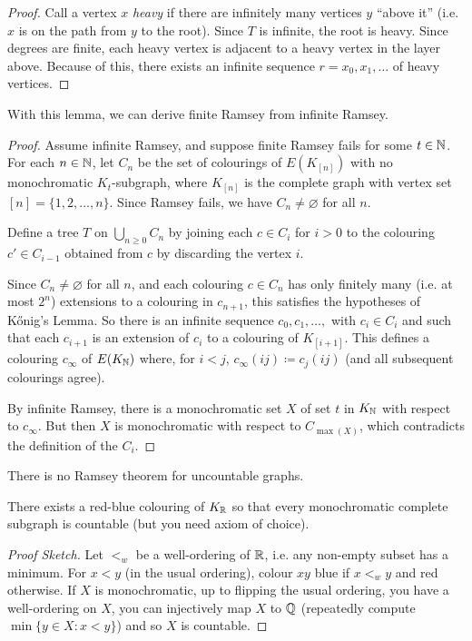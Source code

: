 \documentclass[main.tex]{subfiles}
\begin{document}
\begin{proof}%
  Call a vertex $x$ \textit{heavy} if there are infinitely many vertices $y$
  ``above it'' (i.e. $x$ is on the path from $y$ to the root).
  Since $T$ is infinite, the root is heavy.
  Since degrees are finite, each heavy vertex is adjacent to a heavy vertex in
  the layer above.
  Because of this, there exists an infinite sequence $r = x_0, x_1, \ldots$ of heavy vertices.
\end{proof}
With this lemma, we can derive finite Ramsey from infinite Ramsey.
\begin{proof}
  Assume infinite Ramsey, and suppose finite Ramsey fails for some $t\in\mathbb N$.
  For each $n\in\mathbb N$, let $C_n$ be the set of colourings of $E(K_{[n]})$ with
  no monochromatic $K_t$-subgraph, where $K_{[n]}$ is the complete graph with
  vertex set $[n]=\{1,2,\ldots,n\}$.
  Since Ramsey fails, we have $C_n\neq\varnothing$ for all $n$.

  Define a tree $T$ on $\bigcup_{n\geq 0} C_n$ by joining each $c\in C_i$ for
  $i > 0$ to the colouring $c'\in C_{i-1}$ obtained from $c$ by discarding the
  vertex $i$.

  Since $C_n\neq\varnothing$ for all $n$, and each colouring $c\in C_n$ has
  only finitely many (i.e. at most $2^n$) extensions to a colouring in $c_{n+1}$,
  this satisfies the hypotheses of K\H{o}nig's Lemma.
  So there is an infinite sequence $c_0,c_1,\ldots,$ with $c_i\in C_i$ and such
  that each $c_{i+1}$ is an extension of $c_i$ to a colouring of $K_{[i+1]}$.
  This defines a colouring $c_\infty$ of $E(K_{\mathbb N})$ where, for $i < j$,
  $c_\infty(ij)\coloneqq c_j(ij)$ (and all subsequent colourings agree).

  By infinite Ramsey, there is a monochromatic set $X$ of set $t$ in $K_\mathbb N$
  with respect to $c_\infty$.
  But then $X$ is monochromatic with respect to $C_{\max(X)}$, which contradicts
  the definition of the $C_i$.
\end{proof}
There is no Ramsey theorem for uncountable graphs.
\begin{theorem}[Sierpinski]
  There exists a red-blue colouring of $K_\mathbb R$ so that every monochromatic
  complete subgraph is countable (but you need axiom of choice).
\end{theorem}
\begin{proof}[Proof Sketch]
  Let $<_w$ be a well-ordering of $\mathbb R$, i.e. any non-empty subset has a minimum.
  For $x < y$ (in the usual ordering), colour $xy$ blue if $x <_w y$ and red
  otherwise.
  If $X$ is monochromatic, up to flipping the usual ordering, you have a
  well-ordering on $X$, you can injectively map $X$ to $\mathbb Q$
  (repeatedly compute $\min\{y\in X : x < y\}$) and so $X$ is countable.
\end{proof}
\end{document}
